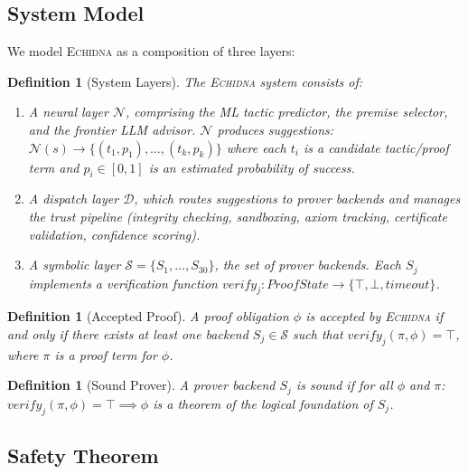 \documentclass[11pt,a4paper]{article}
\newtheorem{definition}[theorem]{Definition}
\newcommand{\echidna}{\textsc{Echidna}}
\newcommand{\neural}{\ensuremath{\mathcal{N}}}
\newcommand{\symbolic}{\ensuremath{\mathcal{S}}}
\begin{document}
\subsection{System Model}

We model \echidna{} as a composition of three layers:

\begin{definition}[System Layers]
\label{def:layers}
The \echidna{} system consists of:
\begin{enumerate}
  \item A \emph{neural layer} $\neural$, comprising the ML tactic predictor,
  the premise selector, and the frontier LLM advisor. $\neural$ produces
  suggestions: $\neural(s) \to \{(t_1, p_1), \ldots, (t_k, p_k)\}$ where each
  $t_i$ is a candidate tactic/proof term and $p_i \in [0,1]$ is an estimated
  probability of success.

  \item A \emph{dispatch layer} $\mathcal{D}$, which routes suggestions to
  prover backends and manages the trust pipeline (integrity checking,
  sandboxing, axiom tracking, certificate validation, confidence scoring).

  \item A \emph{symbolic layer} $\symbolic = \{S_1, \ldots, S_{30}\}$, the set
  of prover backends. Each $S_j$ implements a verification function
  $\mathit{verify}_j : \mathit{ProofState} \to \{\top, \bot, \mathit{timeout}\}$.
\end{enumerate}
\end{definition}

\begin{definition}[Accepted Proof]
\label{def:accepted}
A proof obligation $\phi$ is \emph{accepted} by \echidna{} if and only if
there exists at least one backend $S_j \in \symbolic$ such that
$\mathit{verify}_j(\pi, \phi) = \top$, where $\pi$ is a proof term for $\phi$.
\end{definition}

\begin{definition}[Sound Prover]
A prover backend $S_j$ is \emph{sound} if for all $\phi$ and $\pi$:
$\mathit{verify}_j(\pi, \phi) = \top \implies \phi$ is a theorem of the
logical foundation of $S_j$.
\end{definition}

\subsection{Safety Theorem}
\end{document}
